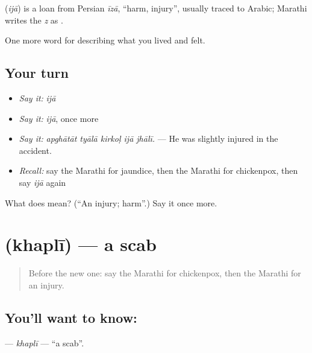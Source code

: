 \begin{cousinweb}
\textbf{} (\emph{ijā}) is a loan from Persian \emph{īzā}, \textquotedblleft{}harm, injury\textquotedblright{}, usually traced to Arabic; Marathi writes the \emph{z} as .
\end{cousinweb}

\begin{grammarlens}[title={What you've built}]
One more word for describing what you lived and felt.
\end{grammarlens}

\subsection*{Your turn}
\begin{itemize}
\raggedright
  \item \emph{Say it:} \emph{ijā}
  \item \emph{Say it:} \emph{ijā}, once more
  \item \emph{Say it:} \emph{apghātāt tyālā kirkoḷ ijā jhālī.} — He was slightly injured in the accident.
  \item \emph{Recall:} say the Marathi for jaundice, then the Marathi for chickenpox, then say \emph{ijā} again
\end{itemize}

\begin{tcolorbox}[breakable,colback=teal!4,colframe=teal!35!black,title={Before you move on}]
What does  mean? (\textquotedblleft{}An injury; harm\textquotedblright{}.) Say it once more.
\end{tcolorbox}
\section[\texorpdfstring{\mr{खपली} (khaplī)}{खपली (khaplī)}]{ (khaplī) — a scab}

\label{lesson:MR-C486-khapli}



\begin{quote}
Before the new one: say the Marathi for chickenpox, then the Marathi for an injury.
\end{quote}

\subsection*{You'll want to know: }
\textbf{} — \emph{khaplī} — \textquotedblleft{}a scab\textquotedblright{}.

